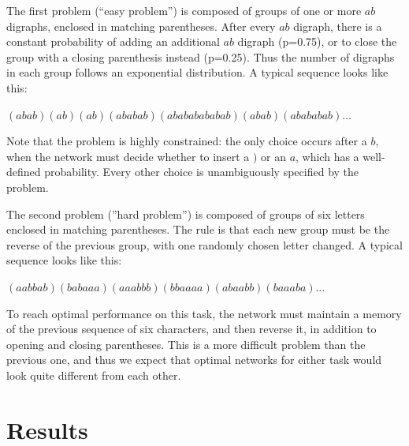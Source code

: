 \documentclass{article}
\begin{document}
The first problem (``easy problem'') is composed of groups of one or more $ab$
digraphs, enclosed in matching parentheses. After every $ab$ digraph, there is
a constant probability of adding an additional $ab$ digraph (p=0.75), or to close the
group with a closing parenthesis instead (p=0.25). Thus the number of digraphs in each
group follows an exponential distribution. A typical sequence looks like this:

\begin{center}
$(abab)(ab)(ab)(ababab)(abababababab)(abab)(abababab)\ldots$
\end{center}

Note that the problem is highly constrained: the only choice occurs after a
$b$, when the network must decide whether to insert a $)$ or an $a$, which has
a well-defined probability. Every other choice is unambiguously specified by the problem. 


The second problem (''hard problem'') is composed of groups of six letters
enclosed in matching parentheses. The rule is that each new group must be the
reverse of the previous group, with one randomly chosen letter changed. A
typical sequence looks like this:

\begin{center}
$(aabbab)(babaaa)(aaabbb)(bbaaaa)(abaabb)(baaaba) \ldots$
\end{center}

To reach optimal performance on this task, the network must maintain a memory
of the previous sequence of six characters, and then reverse it, in addition to opening and closing parentheses. This is a
 more difficult problem than the previous one, and thus we expect that
optimal networks for either task would look quite different from each other.

\section{Results}
\end{document}
